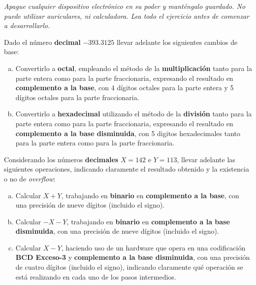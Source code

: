 \documentclass[12pt,a4paper]{article}
\begin{document}

\begin{centering}
\emph{Apague cualquier dispositivo electrónico en su poder y manténgalo guardado. No puede utilizar auriculares, ni calculadora. Lea todo el ejercicio antes de comenzar a desarrollarlo.}	
\end{centering}

  Dado el número \textbf{decimal} $-393.3125$ llevar adelante los siguientes cambios de base:
\begin{enumerate}[a)]
	\item Convertirlo a \textbf{octal}, empleando el método de la \textbf{multiplicación} tanto para la parte entera como para la parte fraccionaria, expresando el resultado en \textbf{complemento a la base}, con 4 dígitos octales para la parte entera y 5 dígitos octales para la parte fraccionaria.

	\item Convertirlo a \textbf{hexadecimal} utilizando el método de la \textbf{división} tanto para la parte entera como para la parte fraccionaria, expresando el resultado en \textbf{complemento a la base disminuida}, con 5 digitos hexadecimales tanto para la parte entera como para la parte fraccionaria.
\end{enumerate}

 Considerando los números {\textbf{decimales}} $X = 142$ e $Y = 113$, llevar adelante las siguientes operaciones, indicando claramente el resultado obtenido y la existencia o no de \emph{overflow}:
\begin{enumerate}[a)]
	\item Calcular $X + Y$, trabajando en \textbf{binario} en \textbf{complemento a la base}, con una precisión de nueve dígitos (incluido el signo).
	\item Calcular $ - X - Y $, trabajando en \textbf{binario} en \textbf{complemento a la base disminuida}, con una precisión de nueve dígitos (incluido el signo).
	\item Calcular $X - Y$, haciendo uso de un hardware que opera en una codificación \textbf{BCD Exceso-3} y \textbf{complemento a la base disminuida}, con una precisión de cuatro dígitos (incluido el signo), indicando claramente qué operación se está realizando en cada uno de los pasos intermedios.
\end{enumerate}
\end{document}
